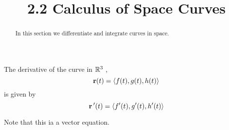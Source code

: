 \documentclass[handout]{ximera}
\title{2.2 Calculus of Space Curves}
\begin{document}
\begin{abstract}
In this section we differentiate and integrate curves in space.
\end{abstract}

\maketitle





The derivative of the curve in $\mathbb R^3$ ,
\[
\mathbf r(t) = \left\langle f(t), g(t), h(t)\right\rangle
\]
is given by
\[
\mathbf r\, '(t) = \left\langle f'(t), g'(t), h'(t)\right\rangle
\]

Note that this ia a vector equation.
\end{document}
